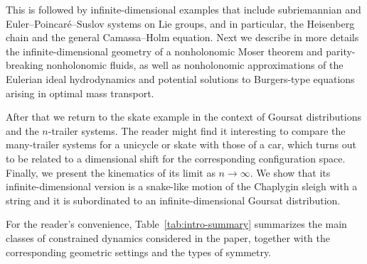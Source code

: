 \documentclass[11pt]{article}
\theoremstyle{definition}
\newcounter{ai}
\begin{document}
This is followed by infinite-dimensional examples that include subriemannian and Euler–Poincaré–Suslov systems on Lie groups, and in particular, the Heisenberg chain and the general Camassa–Holm equation. Next we describe in more details the infinite-dimensional geometry of a nonholonomic Moser theorem and parity-breaking nonholonomic fluids, as well as   nonholonomic approximations of the Eulerian ideal hydrodynamics and potential solutions to Burgers-type equations arising in optimal mass transport. 

After that we return to the skate example in the context of Goursat distributions and the $n$-trailer systems. 
The reader might find it interesting to compare the many-trailer systems for a unicycle or skate 
with those of a car, which turns out to be related to a dimensional shift for the corresponding configuration space. 
Finally, we present the kinematics of its limit as
$n\to \infty$. We show that its infinite-dimensional version  is a snake-like motion of the 
Chaplygin sleigh with a string and it is subordinated to  an infinite-dimensional Goursat distribution.

For the reader's convenience, Table~\ref{tab:intro-summary} summarizes the main classes of constrained dynamics considered in the paper, together with the corresponding  geometric settings and the types of symmetry.
\end{document}

